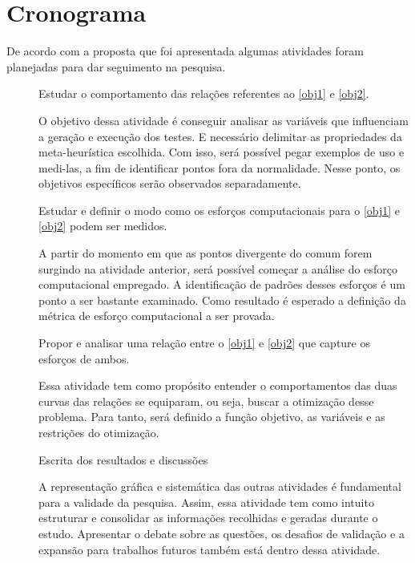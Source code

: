 \section{Cronograma}

De acordo com a proposta que foi apresentada algumas atividades foram planejadas para dar seguimento na pesquisa.

\begin{description}
\item[] Estudar o comportamento das relações referentes ao \ref{obj1} e \ref{obj2}.

O objetivo dessa atividade é conseguir analisar as variáveis que influenciam a geração e execução dos testes. E necessário delimitar as propriedades da meta-heurística escolhida. Com isso, será possível pegar exemplos de uso e medi-las, a fim de identificar pontos fora da normalidade. Nesse ponto, os objetivos específicos serão observados separadamente.

\item[] Estudar e definir o modo como os esforços computacionais para o \ref{obj1} e \ref{obj2} podem ser medidos.

A partir do momento em que as pontos divergente do comum forem surgindo na atividade anterior, será possível começar a análise do esforço computacional empregado. A identificação de padrões desses esforços é um ponto a ser bastante examinado. Como resultado é esperado a definição da métrica de esforço computacional a ser provada.

\item[] Propor e analisar uma relação entre o \ref{obj1} e \ref{obj2} que capture os esforços de ambos.

Essa atividade tem como propósito entender o comportamentos das duas curvas das relações se equiparam, ou seja, buscar a otimização desse problema. Para tanto, será definido a função objetivo, as variáveis e as restrições do otimização. 

\item[] Escrita dos resultados e discussões

A representação gráfica e sistemática das outras atividades é fundamental para a validade da pesquisa. Assim, essa atividade tem como intuito estruturar e consolidar as informações recolhidas e geradas durante o estudo. Apresentar o debate sobre as questões, os desafios de validação e a expansão para trabalhos futuros também está dentro dessa atividade.

\end{description}

